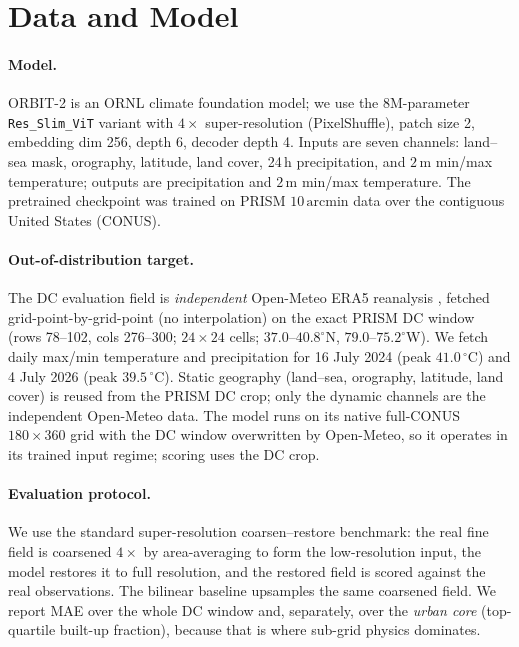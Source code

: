 \documentclass[11pt]{article}
\begin{document}
\section{Data and Model}
\paragraph{Model.} ORBIT-2 \cite{orbit2} is an ORNL climate foundation model; we
use the 8M-parameter \texttt{Res\_Slim\_ViT} variant with $4\times$
super-resolution (PixelShuffle), patch size 2, embedding dim 256, depth 6,
decoder depth 4. Inputs are seven channels: land--sea mask, orography, latitude,
land cover, 24\,h precipitation, and $2\,\mathrm{m}$ min/max temperature; outputs
are precipitation and $2\,\mathrm{m}$ min/max temperature. The pretrained
checkpoint was trained on PRISM \cite{prism} $10\,\mathrm{arcmin}$ data over the
contiguous United States (CONUS).

\paragraph{Out-of-distribution target.} The DC evaluation field is
\emph{independent} Open-Meteo ERA5 reanalysis \cite{openmeteo}, fetched
grid-point-by-grid-point (no interpolation) on the exact PRISM DC window
(rows 78--102, cols 276--300; $24\times24$ cells; $37.0$--$40.8^\circ$N,
$79.0$--$75.2^\circ$W). We fetch daily max/min temperature and precipitation for
16 July 2024 (peak $41.0\,^\circ\mathrm{C}$) and 4 July 2026 (peak
$39.5\,^\circ\mathrm{C}$). Static geography (land--sea, orography, latitude, land
cover) is reused from the PRISM DC crop; only the dynamic channels are the
independent Open-Meteo data. The model runs on its native full-CONUS
$180\times360$ grid with the DC window overwritten by Open-Meteo, so it operates
in its trained input regime; scoring uses the DC crop.

\paragraph{Evaluation protocol.} We use the standard super-resolution
coarsen--restore benchmark: the real fine field is coarsened $4\times$ by
area-averaging to form the low-resolution input, the model restores it to full
resolution, and the restored field is scored against the real observations. The
bilinear baseline upsamples the same coarsened field. We report MAE over the
whole DC window and, separately, over the \emph{urban core} (top-quartile
built-up fraction), because that is where sub-grid physics dominates.
\end{document}
